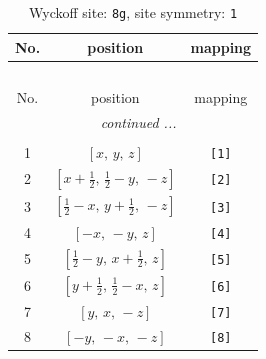 \documentclass[fleqn,8pt]{jsarticle}
\begin{document}
\renewcommand{\arraystretch}{1.2}
\begin{longtable}{ccc}
\caption{Wyckoff site: {\tt 8g}, site symmetry: {\tt 1}}
 \\
 \hline \hline
No. & position & mapping \\ \hline \endfirsthead

\multicolumn{2}{l}{\tablename\ \thetable{}} \\
 \hline \hline
No. & position & mapping \\ \hline \endhead

 \hline \hline
\multicolumn{2}{r}{\footnotesize\it continued ...} \\ \endfoot

 \hline \hline
\multicolumn{2}{r}{} \\ \endlastfoot

1 & $\left[ x,\, y,\, z \right]$ & {\tt [1]} \\ \hline
2 & $\left[ x + \frac{1}{2},\, \frac{1}{2} - y,\, - z \right]$ & {\tt [2]} \\ \hline
3 & $\left[ \frac{1}{2} - x,\, y + \frac{1}{2},\, - z \right]$ & {\tt [3]} \\ \hline
4 & $\left[ - x,\, - y,\, z \right]$ & {\tt [4]} \\ \hline
5 & $\left[ \frac{1}{2} - y,\, x + \frac{1}{2},\, z \right]$ & {\tt [5]} \\ \hline
6 & $\left[ y + \frac{1}{2},\, \frac{1}{2} - x,\, z \right]$ & {\tt [6]} \\ \hline
7 & $\left[ y,\, x,\, - z \right]$ & {\tt [7]} \\ \hline
8 & $\left[ - y,\, - x,\, - z \right]$ & {\tt [8]} \\
\end{longtable}
\end{document}
